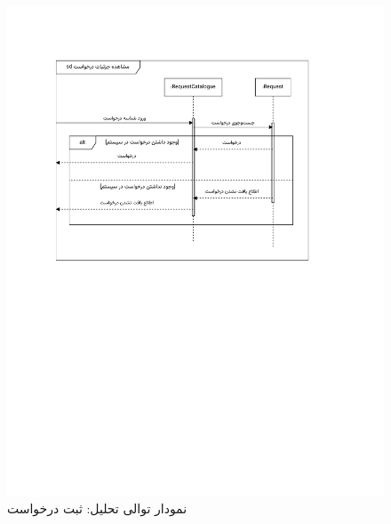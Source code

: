\begin{figure}[ht!]
	\centering
	\includegraphics[scale=0.8, page=8]{figs/OOD-Sequence-2.pdf}
	\caption{نمودار توالی تحلیل: ثبت درخواست}
\end{figure}
\FloatBarrier
\newpage

